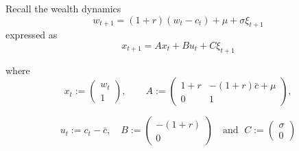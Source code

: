 \begin{frame}
    
    \Eg Recall the wealth dynamics
    \begin{equation*}
        w_{t+1} = (1 + r) (w_t - c_t) + \mu + \sigma \xi_{t+1}
    \end{equation*}
    expressed as
    \begin{equation*}
        x_{t+1} = A x_t + B u_t + C \xi_{t+1}
    \end{equation*}

    where 
    \begin{equation*}
        x_t := 
        \begin{pmatrix}
            w_t
            \\
            1
        \end{pmatrix},
        \qquad
        A :=
        \left(
        \begin{array}{cc}
            1 + r & -(1 + r) \bar c + \mu \\
            0     & 1
        \end{array}
        \right),
    \end{equation*}


        \vspace{0.5em}
    \begin{equation*}
        u_t := c_t - \bar c,
        \quad
        B :=
        \left(
        \begin{array}{c}
            -(1+r) \\
            0
        \end{array}
        \right)
        \quad \text{and } \;
        C :=
        \left(
        \begin{array}{c}
        \sigma \\
            0
        \end{array}
        \right)
    \end{equation*}


\end{frame}




